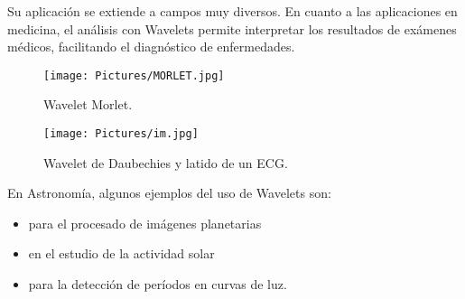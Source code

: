 Su aplicación se extiende a campos muy  diversos. En cuanto a las aplicaciones en medicina, el análisis con Wavelets permite interpretar los resultados de exámenes médicos, facilitando el diagnóstico de enfermedades. 

 
 
\begin{figure}
    \centering
    \texttt{[image: Pictures/MORLET.jpg]}
    \caption{Wavelet Morlet.}
    \label{MORLET}
\end{figure} 

\bigskip
\begin{figure}
    \centering
    \texttt{[image: Pictures/im.jpg]}
    \caption{Wavelet de Daubechies y latido de un ECG. }
    \label{db6yECG}
\end{figure} 
 En Astronomía, algunos ejemplos del uso de Wavelets son:

\begin{itemize}

\item para el procesado de imágenes planetarias 


\item en el estudio de la actividad solar

\item para la detección de períodos en curvas de luz. 
        
\end{itemize}


\bigskip





